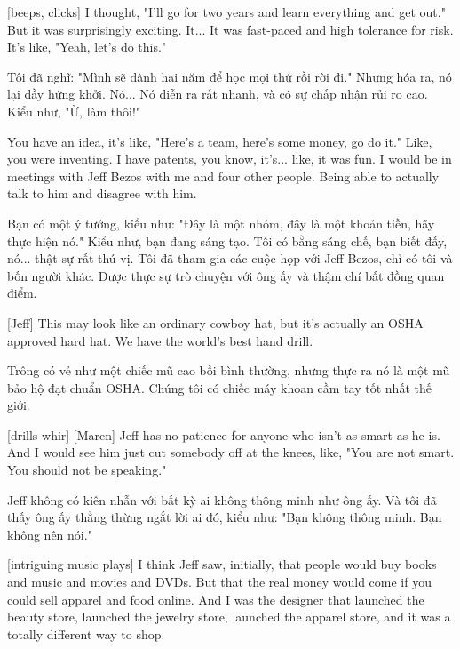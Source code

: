 \documentclass[a4paper]{article}
\begin{document}
	[beeps, clicks]
	I thought, "I'll go for two years and learn everything and get out." But it was surprisingly exciting.
	It... It was fast-paced and high tolerance for risk. It's like, "Yeah, let's do this."

	\begin{vietnamese-v2}
		Tôi đã nghĩ: "Mình sẽ dành hai năm để học mọi thứ rồi rời đi." 
		Nhưng hóa ra, nó lại đầy hứng khởi. 
		Nó... Nó diễn ra rất nhanh, và có sự chấp nhận rủi ro cao. Kiểu như, "Ừ, làm thôi!"
	\end{vietnamese-v2}

	You have an idea, it's like, "Here's a team, here's some money, go do it."
	Like, you were inventing. I have patents, you know, it's... like, it was fun.
	I would be in meetings with Jeff Bezos with me and four other people.
	Being able to actually talk to him and disagree with him.

	\begin{vietnamese-v2}
		Bạn có một ý tưởng, kiểu như: "Đây là một nhóm, đây là một khoản tiền, hãy thực hiện nó." 
		Kiểu như, bạn đang sáng tạo. 
		Tôi có bằng sáng chế, bạn biết đấy, nó... thật sự rất thú vị. 
		Tôi đã tham gia các cuộc họp với Jeff Bezos, chỉ có tôi và bốn người khác. Được thực sự trò chuyện với ông ấy và thậm chí bất đồng quan điểm.
	\end{vietnamese-v2}

	[Jeff] This may look like an ordinary cowboy hat, but it's actually an OSHA approved hard hat.
	We have the world's best hand drill.
	
	\begin{vietnamese-v2}
		[Jeff] Trông có vẻ như một chiếc mũ cao bồi bình thường, nhưng thực ra nó là một mũ bảo hộ đạt chuẩn OSHA. Chúng tôi có chiếc máy khoan cầm tay tốt nhất thế giới.	
	\end{vietnamese-v2}
	
	[drills whir]
	[Maren] Jeff has no patience for anyone who isn't as smart as he is.
	And I would see him just cut somebody off at the knees, like, "You are not smart. You should not be speaking."
	
	\begin{vietnamese-v2}
		 Jeff không có kiên nhẫn với bất kỳ ai không thông minh như ông ấy. 
		Và tôi đã thấy ông ấy thẳng thừng ngắt lời ai đó, kiểu như: "Bạn không thông minh. Bạn không nên nói."
	\end{vietnamese-v2}
	
	[intriguing music plays]
	I think Jeff saw, initially, that people would buy books and music and movies and DVDs.
	But that the real money would come if you could sell apparel and food online.
	And I was the designer that launched the beauty store, launched the jewelry store, launched the apparel store, and it was a totally different way to shop.
	
\end{document}
